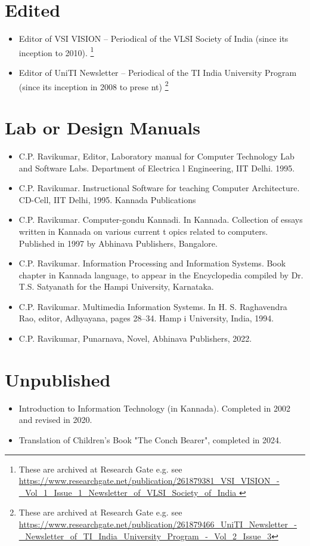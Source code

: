\documentclass[onecolumn]{IEEEtran}
\begin{document}
\section*{Edited}
\begin{itemize}
\item   Editor of VSI VISION – Periodical of the VLSI Society of India (since its inception to 2010).
\footnote{
These are archived at Research Gate e.g. see \url{https://www.researchgate.net/publication/261879381_VSI_VISION_-_Vol_1_Issue_1_Newsletter_of_VLSI_Society_of_India
}
}
\item   Editor of UniTI Newsletter – Periodical of the TI India University Program (since its inception in 2008 to prese
nt)
\footnote{
These are archived at Research Gate e.g. see \url{https://www.researchgate.net/publication/261879466_UniTI_Newsletter_-_Newsletter_of_TI_India_University_Program_-_Vol_2_Issue_3}
}
\end{itemize}

\section*{Lab or Design Manuals}
\begin{itemize}
\item   C.P. Ravikumar, Editor, Laboratory manual for Computer Technology Lab and Software Labs. Department of Electrica
l Engineering, IIT Delhi. 1995.
\item   C.P. Ravikumar. Instructional Software for teaching Computer Architecture. CD-Cell, IIT Delhi, 1995.
Kannada Publications
\item   C.P. Ravikumar. Computer-gondu Kannadi. In Kannada. Collection of essays written in Kannada on various current t
opics related to computers. Published in 1997 by Abhinava Publishers, Bangalore.
\item   C.P. Ravikumar. Information Processing and Information Systems.  Book chapter in Kannada language, to appear in
the Encyclopedia  compiled by Dr. T.S. Satyanath for the Hampi University, Karnataka.
\item   C.P. Ravikumar.  Multimedia Information Systems. In H. S. Raghavendra Rao, editor, Adhyayana, pages 28--34. Hamp
i University, India, 1994.
\item C.P. Ravikumar, Punarnava, Novel, Abhinava Publishers, 2022.
\end{itemize}

\section*{Unpublished}
\begin{itemize}
\item Introduction to Information Technology (in Kannada). Completed in 2002 and revised in 2020.
\item Translation of Children's Book "The Conch Bearer", completed in 2024.
\end{itemize}
\end{document}
